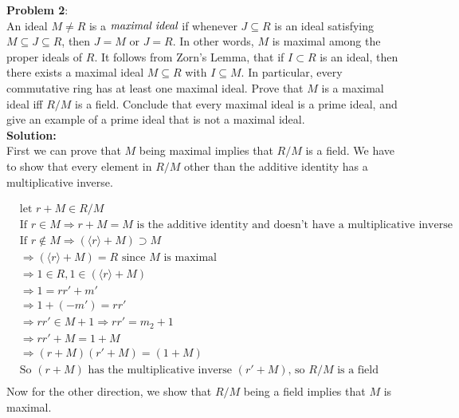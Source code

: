 \documentclass[11pt]{article}
\newcommand{\prob}[3]{\begin{flushleft}
        \textbf{Problem #1}: \\
        #2 
		\textbf{Solution:} 
		#3

\end{flushleft}}
\begin{document}
\prob{2}{
An ideal $M \neq R$ is a $\emph{maximal ideal}$ if whenever $J \subseteq R$ is an ideal satisfying $M \subseteq J \subseteq R$, then $J = M$ or $J = R$. In other words, $M$ is maximal among the proper ideals of $R$. It follows from Zorn's Lemma, that if $I \subset R$ is an ideal, then there exists a maximal ideal $M \subseteq R$ with $I \subseteq M$. In particular, every commutative ring has at least one maximal ideal. Prove that $M$ is a maximal ideal iff $R/M$ is a field. Conclude that every maximal ideal is a prime ideal, and give an example of a prime ideal that is not a maximal ideal.
\\
}
{\\
First we can prove that $M$ being maximal implies that $R/M$ is a field. We have to show that every element in $R/M$ other than the additive identity has a multiplicative inverse.

\begin{align*}
&\text{let } r + M \in R/M\\
&\text{If } r \in M \Rightarrow r + M = M\text { is the additive identity and doesn't have a multiplicative inverse}\\
&\text{If } r \notin M \Rightarrow (\langle r \rangle + M) \supset M\\
&\Rightarrow (\langle r \rangle + M) = R \text{ since $M$ is maximal}\\
&\Rightarrow 1 \in R, 1 \in (\langle r \rangle + M)\\
&\Rightarrow 1 = rr' + m'\\
&\Rightarrow 1 + (-m') = rr'\\
&\Rightarrow rr' \in M + 1 \Rightarrow rr' = m_2 + 1\\
&\Rightarrow rr' + M = 1 + M\\
&\Rightarrow (r + M)(r' + M) = (1 + M)\\
&\text{So $(r + M)$ has the multiplicative inverse $(r' + M)$, so $R/M$ is a field}\\
\end{align*}
Now for the other direction, we show that $R/M$ being a field implies that $M$ is maximal.

}
\end{document}
